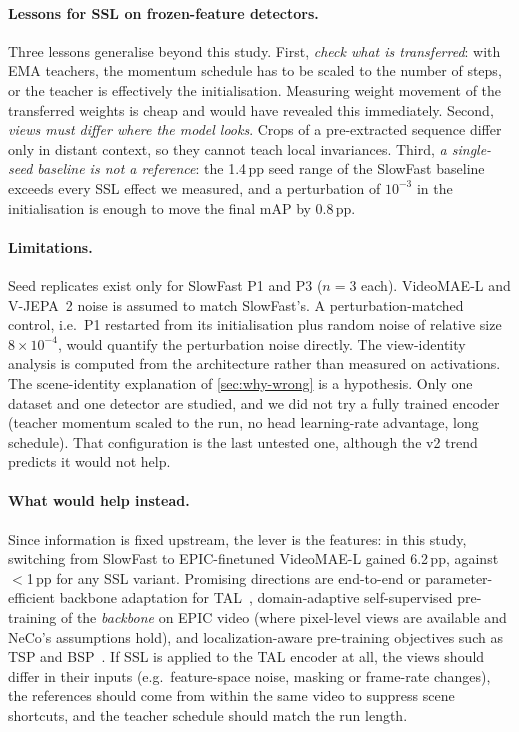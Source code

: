 \documentclass[10pt,a4paper]{article}
\newcommand{\pp}{\,pp}
\begin{document}
\paragraph{Lessons for SSL on frozen-feature detectors.} Three lessons generalise beyond
this study. First, \emph{check what is transferred}: with EMA teachers, the momentum
schedule has to be scaled to the number of steps, or the teacher is effectively the
initialisation. Measuring weight movement of the transferred weights is cheap and would
have revealed this immediately. Second, \emph{views must differ where the model looks}.
Crops of a pre-extracted sequence differ only in distant context, so they cannot teach
local invariances. Third, \emph{a single-seed baseline is not a reference}: the 1.4\pp{}
seed range of the SlowFast baseline exceeds every SSL effect we measured, and a
perturbation of $10^{-3}$ in the initialisation is enough to move the final mAP by
0.8\pp.

\paragraph{Limitations.} Seed replicates exist only for SlowFast P1 and P3 ($n{=}3$
each). VideoMAE-L and V-JEPA~2 noise is assumed to match SlowFast's. A
perturbation-matched control, i.e.\ P1 restarted from its initialisation plus random noise of
relative size $8\times10^{-4}$, would quantify the perturbation noise directly. The view-identity
analysis is computed from the architecture rather than measured on activations. The
scene-identity explanation of \cref{sec:why-wrong} is a hypothesis. Only one
dataset and one detector are studied, and we did not try a fully trained encoder
(teacher momentum scaled to the run, no head learning-rate advantage, long schedule).
That configuration is the last untested one, although the v2 trend predicts it would not
help.

\paragraph{What would help instead.} Since information is fixed upstream, the lever is the
features: in this study, switching from SlowFast to EPIC-finetuned VideoMAE-L gained 6.2\pp,
against $<$1\pp{} for any SSL variant. Promising directions are end-to-end or
parameter-efficient backbone adaptation for TAL~\cite{liu2024adatad}, domain-adaptive
self-supervised pre-training of the \emph{backbone} on EPIC video (where pixel-level views
are available and NeCo's assumptions hold), and localization-aware pre-training objectives
such as TSP and BSP~\cite{alwassel2021tsp,xu2021bsp}. If SSL is applied to the TAL encoder
at all, the views should differ in their inputs (e.g.\ feature-space noise, masking or
frame-rate changes), the references should come from within the same video to suppress
scene shortcuts, and the teacher schedule should match the run length.
\end{document}
